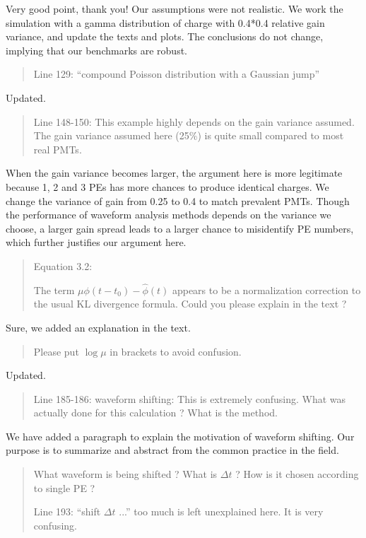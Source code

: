 \documentclass[12pt]{article}
\begin{document}
Very good point, thank you!  Our assumptions were not realistic.  We work the simulation with a gamma distribution of charge with 0.4*0.4 relative gain variance, and update the texts and plots.  The conclusions do not change, implying that our benchmarks are robust. 

\begin{quote}
Line 129: ``compound Poisson distribution with a Gaussian jump''
\end{quote}

Updated.

\begin{quote}
Line 148-150: This example highly depends on the gain variance assumed. The gain variance assumed here (25\%) is quite small compared to most real PMTs.
\end{quote}

When the gain variance becomes larger, the argument here is more legitimate because 1, 2 and 3 PEs has more chances to produce identical charges. We change the variance of gain from 0.25 to 0.4 to match prevalent PMTs. Though the performance of waveform analysis methods depends on the variance we choose, a larger gain spread leads to a larger chance to misidentify PE numbers, which further justifies our argument here.

\begin{quote}
Equation 3.2:

The term $\mu\phi(t-t_0)-\hat{\phi}(t)$ appears to be a normalization correction to the usual KL divergence formula. Could you please explain in the text ?
\end{quote}

Sure, we added an explanation in the text.

\begin{quote}
Please put $\log\mu$ in brackets to avoid confusion.
\end{quote}

Updated.

\begin{quote}
Line 185-186: waveform shifting: This is extremely confusing. What was actually done for this calculation ? What is the method. 
\end{quote}

We have added a paragraph to explain the motivation of waveform shifting.  Our purpose is to summarize and abstract from the common practice in the field. 

\begin{quote}
What waveform is being shifted ? What is $\Delta t$ ? How is it chosen according to single PE ?

Line 193: ``shift $\Delta t$ ...'' too much is left unexplained here. It is very confusing.
\end{quote}
\end{document}
